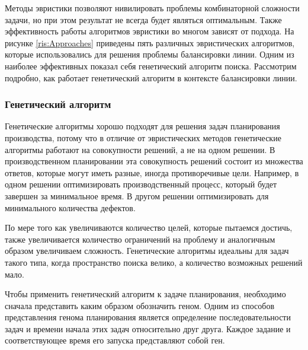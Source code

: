 Методы эвристики позволяют нивилировать проблемы комбинаторной сложности задачи, но при этом результат не всегда будет являться оптимальным. Также эффективность работы алгоритмов эвристики во многом зависят от подхода. На рисунке \ref{ris:Approaches} приведены пять различных эвристических алгоритмов, которые использовались для решения проблемы балансировки линии. Одним из наиболее эффективных показал себя генетический алгоритм поиска. Рассмотрим подробно, как работает генетический алгоритм в контексте балансировки линии.

\subsubsection*{Генетический алгоритм}

Генетические алгоритмы хорошо подходят для решения задач планирования производства, потому что в отличие от эвристических методов генетические алгоритмы работают на совокупности решений, а не на одном решении. В производственном планировании эта совокупность решений состоит из множества ответов, которые могут иметь разные, иногда противоречивые цели. Например, в одном решении оптимизировать производственный процесс, который будет завершен за минимальное время. В другом решении оптимизировать для минимального количества дефектов.

По мере того как увеличиваются количество целей, которые пытаемся достичь, также увеличивается количество ограничений на проблему и аналогичным образом увеличиваем сложность. Генетические алгоритмы идеальны для задач такого типа, когда пространство поиска велико, а количество возможных решений мало.

Чтобы применить генетический алгоритм к задаче планирования, необходимо сначала представить каким образом обозначить геном. Одним из способов представления генома планирования является определение последовательности задач и времени начала этих задач относительно друг друга. Каждое задание и соответствующее время его запуска представляют собой ген.

